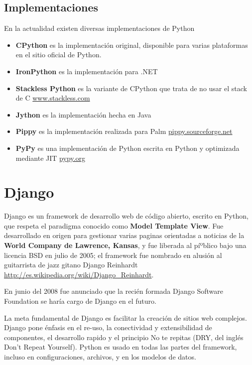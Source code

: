\subsection{Implementaciones}

En la actualidad existen diversas implementaciones de Python

\begin{itemize}
    \item {\bfseries CPython} es la implementación original, disponible para varias plataformas en el sitio oficial de Python.
    \item {\bfseries IronPython} es la implementación para .NET
    \item {\bfseries Stackless Python} es la variante de CPython que trata de no usar el stack de C  \url{www.stackless.com}
    \item {\bfseries Jython} es la implementación hecha en Java
    \item {\bfseries Pippy} es la implementación realizada para Palm \url{pippy.sourceforge.net}
    \item {\bfseries PyPy} es una implementación de Python escrita en Python y optimizada mediante JIT \url{pypy.org}
\end{itemize}



\section{Django}

Django es un framework de desarrollo web de código abierto, escrito en Python, que respeta el paradigma conocido como {\bfseries Model Template View}. Fue desarrollado en origen para gestionar varias paginas orientadas a noticias de la {\bfseries World Company de Lawrence, Kansas}, y fue liberada al píºblico bajo una licencia BSD en julio de 2005; el framework fue nombrado en alusión al guitarrista de jazz gitano Django Reinhardt \url{http://es.wikipedia.org/wiki/Django_Reinhardt}.

En junio del 2008 fue anunciado que la recién formada Django Software Foundation se harí­a cargo de Django en el futuro.

La meta fundamental de Django es facilitar la creación de sitios web complejos. Django pone énfasis en el re-uso, la conectividad y extensibilidad de componentes, el desarrollo rapido y el principio No te repitas
(DRY, del inglés Don't Repeat Yourself). Python es usado en todas las partes del framework, incluso en configuraciones, archivos, y en los modelos de datos.


